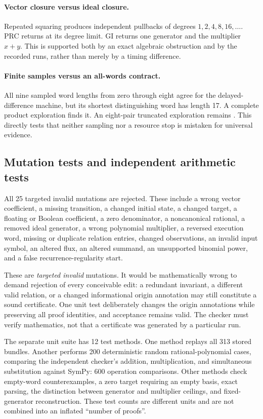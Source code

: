 \paragraph{Vector closure versus ideal closure.}
Repeated squaring produces independent pullbacks of degrees $1,2,4,8,16,\ldots$. PRC returns \unknown{} at its degree limit. GI returns one generator and the multiplier $x+y$. This is supported both by an exact algebraic obstruction and by the recorded runs, rather than merely by a timing difference.

\paragraph{Finite samples versus an all-words contract.}
All nine sampled word lengths from zero through eight agree for the delayed-difference machine, but its shortest distinguishing word has length 17. A complete product exploration finds it. An eight-pair truncated exploration remains \unknown{}. This directly tests that neither sampling nor a resource stop is mistaken for universal evidence.

\subsection{Mutation tests and independent arithmetic tests}

All 25 targeted invalid mutations are rejected. These include a wrong vector coefficient, a missing transition, a changed initial state, a changed target, a floating or Boolean coefficient, a zero denominator, a noncanonical rational, a removed ideal generator, a wrong polynomial multiplier, a reversed execution word, missing or duplicate relation entries, changed observations, an invalid input symbol, an altered flux, an altered summand, an unsupported binomial power, and a false recurrence-regularity start.

These are \emph{targeted invalid} mutations. It would be mathematically wrong to demand rejection of every conceivable edit: a redundant invariant, a different valid relation, or a changed informational origin annotation may still constitute a sound certificate. One unit test deliberately changes the origin annotations while preserving all proof identities, and acceptance remains valid. The checker must verify mathematics, not that a certificate was generated by a particular run.

The separate unit suite has 12 test methods. One method replays all 313 stored bundles. Another performs 200 deterministic random rational-polynomial cases, comparing the independent checker's addition, multiplication, and simultaneous substitution against SymPy: 600 operation comparisons. Other methods check empty-word counterexamples, a zero target requiring an empty basis, exact parsing, the distinction between generator and multiplier ceilings, and fixed-generator reconstruction. These test counts are different units and are not combined into an inflated ``number of proofs''.

